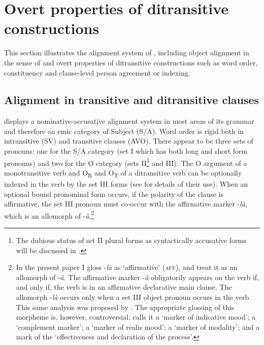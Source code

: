 \documentclass[output=paper]{langsci/langscibook}
\begin{document}
\section{Overt properties of ditransitive constructions}\label{§4:overt.pacchiarotti}

This section illustrates the alignment system of , including object alignment in the sense of \citet{malchukovetal2010} and overt properties of ditransitive constructions such as word order, constituency and clause-level person agreement or indexing.

\subsection{Alignment in transitive and ditransitive clauses}\label{§4.1:alignment.pacchiarotti}

 displays a nominative-accusative alignment system in most areas of its grammar and therefore an emic category of Subject (S/A). Word order is rigid both in intransitive (SV) and transitive clauses (AVO). There appear to be three sets of pronouns: one for the S/A category (set I which has both long and short form pronouns) and two for the O category (sets II\footnote{The dubious status of set II plural forms as syntactically accusative forms will be discussed in .} and III). The O argument of a monotransitive verb and O\textsubscript{R} and O\textsubscript{T} of a ditransitive verb can be optionally indexed in the verb by the set III forms (see  for details of their use). When an optional bound pronominal form occurs, if the polarity of the clause is affirmative, the set III pronoun must co-occur with the affirmative marker -\textit{là}, which is an allomorph of -\textit{à}.\footnote{In the present paper I gloss -\textit{là} as `affirmative' (\textsc{aff}), and treat it as an allomorph of -\textit{à}. The affirmative marker -\textit{à} obligatorily appears on the verb if, and only if, the verb is in an affirmative declarative main clause. The allomorph -\textit{là} occurs only when a set III object pronoun occurs in the verb. This same analysis was proposed by \citet{manessy1963}. The appropriate glossing of this morpheme is, however, controversial. \citet[96]{alexandre1953} calls it a `marker of indicative mood'; \citet[112]{peterson1971} a `complement marker'; \citet{canu1974} a `marker of realis mood'; \citet{kabore1985} a `marker of modality'; and \citet{nikiema2003} a mark of the `effectiveness and declaration of the process'.} 
\end{document}
